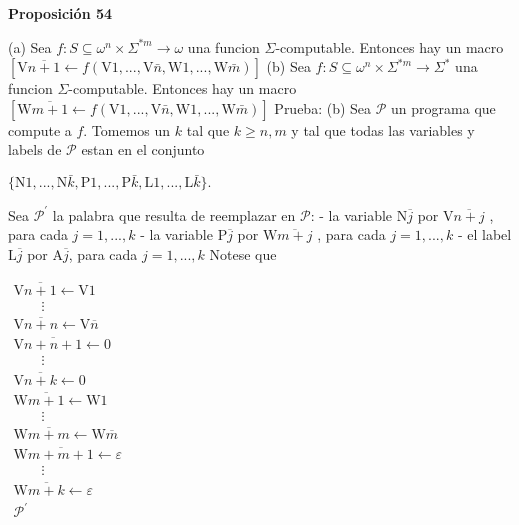 \textbf{Proposición 54}

(a) Sea \(f:S\subseteq \omega ^{n}\times \Sigma ^{\ast m}\rightarrow \omega \) una funcion \(\Sigma \)-computable. Entonces hay un macro
\(\displaystyle \left[ \mathrm{V}\overline{n+1}\leftarrow f(\mathrm{V}1,...,\mathrm{V}\bar{n} ,\mathrm{W}1,...,\mathrm{W}\bar{m})\right] \)
(b) Sea \(f:S\subseteq \omega ^{n}\times \Sigma ^{\ast m}\rightarrow \Sigma ^{\ast }\) una funcion \(\Sigma \)-computable. Entonces hay un macro
\(\displaystyle \left[ \mathrm{W}\overline{m+1}\leftarrow f(\mathrm{V}1,...,\mathrm{V}\bar{n} ,\mathrm{W}1,...,\mathrm{W}\bar{m})\right] \)
Prueba: (b) Sea \(\mathcal{P}\) un programa que compute a \(f\). Tomemos un \(k\) tal que \( k\geq n,m\) y tal que todas las variables y labels de \(\mathcal{P}\) estan en el conjunto

\(\displaystyle \{\mathrm{N}1,...,\mathrm{N}\bar{k},\mathrm{P}1,...,\mathrm{P}\bar{k}, \mathrm{L}1,...,\mathrm{L}\bar{k}\}\text{.} \)

Sea \(\mathcal{P}^{\prime }\) la palabra que resulta de reemplazar en \( \mathcal{P}\):
- la variable \(\mathrm{N}\overline{j}\) por \(\mathrm{V}\overline{n+j}\) , para cada \(j=1,...,k\)
- la variable \(\mathrm{P}\overline{j}\) por \(\mathrm{W}\overline{m+j}\) , para cada \(j=1,...,k\)
- el label \(\mathrm{L}\overline{j}\) por \(\mathrm{A}\overline{j}\), para cada \(j=1,...,k\)
Notese que

\(\displaystyle \begin{array}{l} \mathrm{V}\overline{n+1}\leftarrow \mathrm{V}1 \\ \ \ \ \ \ \ \ \ \ \vdots \\ \mathrm{V}\overline{n+n}\leftarrow \mathrm{V}\overline{n} \\ \mathrm{V}\overline{n+n+1}\leftarrow 0 \\ \ \ \ \ \ \ \ \ \ \vdots \\ \mathrm{V}\overline{n+k}\leftarrow 0 \\ \mathrm{W}\overline{m+1}\leftarrow \mathrm{W}1 \\ \ \ \ \ \ \ \ \ \ \vdots \\ \mathrm{W}\overline{m+m}\leftarrow \mathrm{W}\overline{m} \\ \mathrm{W}\overline{m+m+1}\leftarrow \varepsilon \\ \ \ \ \ \ \ \ \ \ \vdots \\ \mathrm{W}\overline{m+k}\leftarrow \varepsilon \\ \mathcal{P}^{\prime } \end{array} \)

